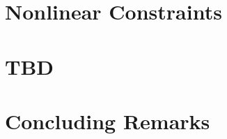 \documentclass[11pt,letterpaper]{thesis2}
\begin{document}
\chapter{Nonlinear Constraints}\label{chap:convex}

\chapter{TBD}\label{chap:tbd}

\chapter{Concluding Remarks}\label{chap:conclusion}


% 





% 

% 
\end{document}
